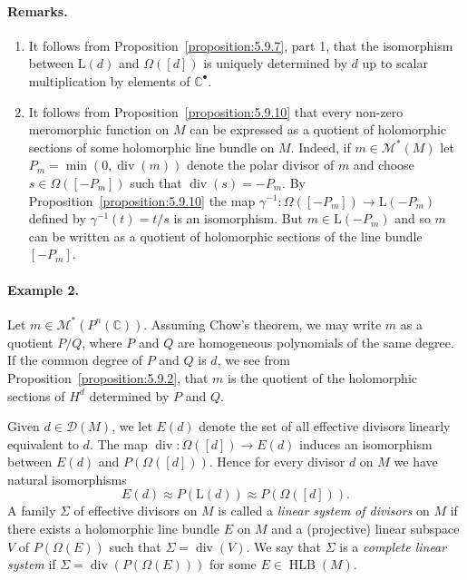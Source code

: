 \paragraph{Remarks.}
\begin{enumerate}
\item It follows from Proposition~\ref{proposition:5.9.7}, part 1, that the isomorphism between $\mathrm L(d)$ and $\Omega([d])$ is uniquely determined by $d$ up to scalar multiplication by elements of $\mathbb C^\bullet$.
\item It follows from Proposition~\ref{proposition:5.9.10} that every non-zero meromorphic function on $M$ can be expressed as a quotient of holomorphic sections of some holomorphic line bundle on $M$. Indeed, if $m\in\mathcal M^*(M)$ let $P_m=\min(0,\operatorname{div}(m))$ denote the polar divisor of $m$ and choose $s\in\Omega([-P_m])$ such that $\operatorname{div}(s)=-P_m$. By Proposition~\ref{proposition:5.9.10} the map $\gamma^{-1}:\Omega([-P_m])\to\mathrm L(-P_m)$ defined by $\gamma^{-1}(t)=t/s$ is an isomorphism. But $m\in\mathrm L(-P_m)$ and so $m$ can be written as a quotient of holomorphic sections of the line bundle $[-P_m]$.
\end{enumerate}
\paragraph{Example 2.} Let $m\in\mathcal M^*(P^n(\mathbb C))$. Assuming Chow's theorem, we may write $m$ as a quotient $P/Q$, where $P$ and $Q$ are homogeneous polynomials of the same degree. If the common degree of $P$ and $Q$ is $d$, we see from Proposition~\ref{proposition:5.9.2}, that $m$ is the quotient of the holomorphic sections of $H^d$ determined by $P$ and $Q$.

Given $d\in\mathcal D(M)$, we let $E(d)$ denote the set of all effective divisors linearly equivalent to $d$. The map $\operatorname{div}:\Omega([d])\to E(d)$ induces an isomorphism between $E(d)$ and $P(\Omega([d]))$. Hence for every divisor $d$ on $M$ we have natural isomorphisms
\[E(d)\approx P(\mathrm L(d))\approx P(\Omega([d])).\]
A family $\Sigma$ of effective divisors on $M$ is called a \emph{linear system of divisors} on $M$ if there exists a holomorphic line bundle $E$ on $M$ and a (projective) linear subspace $V$ of $P(\Omega(E))$ such that $\Sigma=\operatorname{div}(V)$. We say that $\Sigma$ is a \emph{complete linear system} if $\Sigma=\operatorname{div}(P(\Omega(E)))$ for some $E\in\operatorname{HLB}(M)$.

